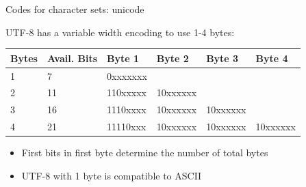 \documentclass[11pt,compress,t,notes=noshow, xcolor=table]{beamer}
\begin{document}
\begin{vbframe}{Codes for character sets: unicode}
\framebreak

UTF-8 has a variable width encoding to use 1-4 bytes:
  \begin{table}
    \begin{tabular}{llllll}
      \toprule
    Bytes & Avail. Bits & Byte 1   & Byte 2   & Byte 3   & Byte 4   \\ \midrule
    1     & 7           & 0xxxxxxx &          &          &          \\
    2     & 11          & 110xxxxx & 10xxxxxx &          &          \\
    3     & 16          & 1110xxxx & 10xxxxxx & 10xxxxxx &          \\
    4     & 21          & 11110xxx & 10xxxxxx & 10xxxxxx & 10xxxxxx \\
    \bottomrule
    \end{tabular}
  \end{table}
\begin{itemize}
  \item First bits in first byte determine the number of total bytes
  \item UTF-8 with 1 byte is compatible to ASCII
\end{itemize}

\end{vbframe}

\endlecture
\end{document}
